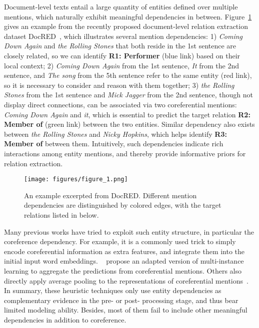 \documentclass[letterpaper]{article} \usepackage{aaai21}  \usepackage{times}  \usepackage{helvet} \usepackage{courier}  \usepackage[hyphens]{url}  \usepackage{graphicx} \usepackage{booktabs}
\begin{document}
Document-level texts entail a large quantity of entities defined over multiple mentions,
which naturally exhibit meaningful dependencies in between.
Figure~\ref{figure_1} gives an example from the recently proposed document-level relation extraction dataset DocRED~\cite{yao-etal-2019-docred}, which illustrates several mention dependencies:
1) \textit{Coming Down Again} and \textit{the Rolling Stones} that both reside in the 1st sentence are closely related, so we can identify \textbf{R1: Performer} (blue link) based on their local context;
2) \textit{Coming Down Again} from the 1st sentence, \textit{It} from the 2nd sentence, and \textit{The song} from the 5th sentence refer to the same entity (red link), so it is necessary to consider and reason with them together;
3) \textit{the Rolling Stones} from the 1st sentence and \textit{Mick Jagger} from the 2nd sentence, though not display direct connections, can be associated via two coreferential mentions: \textit{Coming Down Again} and \textit{it}, which is essential to predict the target relation \textbf{R2: Member of} (green link) between the two entities. Similar dependency also exists between \textit{the Rolling Stones} and \textit{Nicky Hopkins}, which helps identify \textbf{R3: Member of} between them.
Intuitively, such dependencies indicate rich interactions among entity mentions, and thereby provide informative priors for relation extraction.


\begin{figure}
\centering
 \texttt{[image: figures/figure\_1.png]}
\caption{
An example excerpted from DocRED. Different mention dependencies are distinguished by colored edges, with the target relations listed in below.}
\label{figure_1}
\end{figure}

Many previous works have tried to exploit such entity structure, in particular the coreference dependency.
For example, it is a commonly used trick to simply encode coreferential information as extra features, and integrate them into the initial input word embeddings.
~\citet{verga-etal-2018-simultaneously} propose an adapted version of multi-instance learning to aggregate the predictions from coreferential mentions.
Others also directly apply average pooling to the representations of coreferential mentions~\cite{yao-etal-2019-docred}.
In summary, these heuristic techniques only use entity dependencies as complementary evidence in the pre- or post- processing stage, and thus bear limited modeling ability.
Besides, most of them fail to include other meaningful dependencies in addition to coreference.
\end{document}
